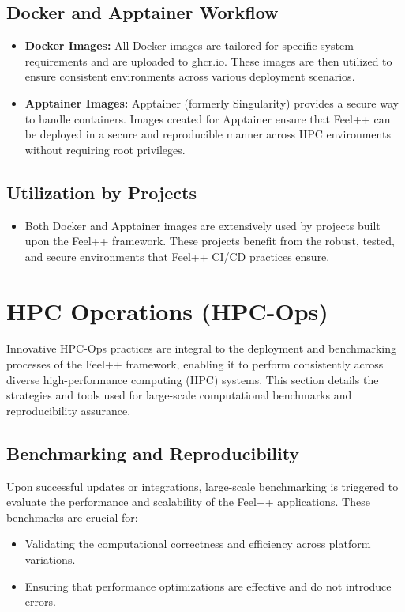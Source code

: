 \subsection{Docker and Apptainer Workflow}
\begin{itemize}
    \item \textbf{Docker Images:} All Docker images are tailored for specific system requirements and are uploaded to ghcr.io. These images are then utilized to ensure consistent environments across various deployment scenarios.
    \item \textbf{Apptainer Images:} Apptainer (formerly Singularity) provides a secure way to handle containers. Images created for Apptainer ensure that Feel++ can be deployed in a secure and reproducible manner across HPC environments without requiring root privileges.
\end{itemize}



\subsection{Utilization by Projects}
\begin{itemize}
    \item Both Docker and Apptainer images are extensively used by projects built upon the Feel++ framework. These projects benefit from the robust, tested, and secure environments that Feel++ CI/CD practices ensure.
\end{itemize}

\section{HPC Operations (HPC-Ops)}
Innovative HPC-Ops practices are integral to the deployment and benchmarking processes of the Feel++ framework, enabling it to perform consistently across diverse high-performance computing (HPC) systems. This section details the strategies and tools used for large-scale computational benchmarks and reproducibility assurance.

\subsection{Benchmarking and Reproducibility}
Upon successful updates or integrations, large-scale benchmarking is triggered to evaluate the performance and scalability of the Feel++ applications. These benchmarks are crucial for:
\begin{itemize}
    \item Validating the computational correctness and efficiency across platform variations.
    \item Ensuring that performance optimizations are effective and do not introduce errors.
\end{itemize}

